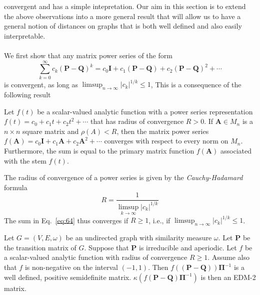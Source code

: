 convergent and has a simple intepretation. Our aim in this section is
to extend the above observations into a more general result that will
allow us to have a general notion of distances on
graphs that is both well defined and also easily interpretable. \\ \\
\noindent
We first show that any matrix power series of the form
\begin{equation}
  \label{eq:64}
  \sum_{k=0}^{\infty}{c_k (\mathbf{P} - \mathbf{Q})^{k}} = 
c_0\mathbf{I} + c_1(\mathbf{P} - \mathbf{Q}) + c_2(\mathbf{P} -
  \mathbf{Q})^{2} + \cdots
\end{equation}
is convergent, as long as $\limsup_{n \rightarrow \infty} |c_k|^{1/k}
\leq 1$, This is a consequence of the following result \citep[\S
6.2]{horn94:_topic_in_matrix_analy}
\begin{theorem}
  \label{thm:3}
  Let $f(t)$ be a scalar-valued analytic function with a power series
  representation $f(t) = c_0 + c_1t + c_2 t^2 + \cdots$ that has radius
  of convergence $R > 0$. If $\mathbf{A} \in M_n$ is a $n \times n$
  square matrix and $\rho(A) < R$, then the matrix power series
  $f(\mathbf{A}) = c_0 \mathbf{I} + c_1 \mathbf{A} + c_2 \mathbf{A}^2
  + \cdots$ converges with respect to every norm on $M_n$. Furthermore,
  the sum is equal to the primary matrix function $f(\mathbf{A})$
  associated with the stem $f(t)$.
\end{theorem}
The radius of convergence of a power series is given by the {\em
  Cauchy-Hadamard} \/ formula \citep[\S V.3]{gamelin01:_compl_analy}
\begin{equation}
  \label{eq:65}
  R = \frac{1}{\limsup_{k \rightarrow \infty}{|c_k|^{1/k}}}
\end{equation}
The sum in Eq.~\eqref{eq:64} thus converges if $R \geq 1$, i.e.,
if $\limsup_{n \rightarrow \infty} |c_k|^{1/k} \leq 1$. 
\begin{proposition}
  \label{prop:13}
  Let $G = (V,E,\omega)$ be an undirected graph with similarity
  measure $\omega$. Let $\mathbf{P}$ be the transition matrix of
  $G$. Suppose that $\mathbf{P}$ is irreducible and aperiodic.  Let
  $f$ be a scalar-valued analytic function with radius of convergence
  $R \geq 1$. Assume also that $f$ is non-negative on the interval
  $(-1,1)$. Then $f((\mathbf{P} - \mathbf{Q}))\bm{\Pi}^{-1}$ is a well
  defined, positive semidefinite matrix. $\kappa(f(\mathbf{P} -
  \mathbf{Q})\bm{\Pi}^{-1})$ is then an EDM-2 matrix.
\end{proposition}
